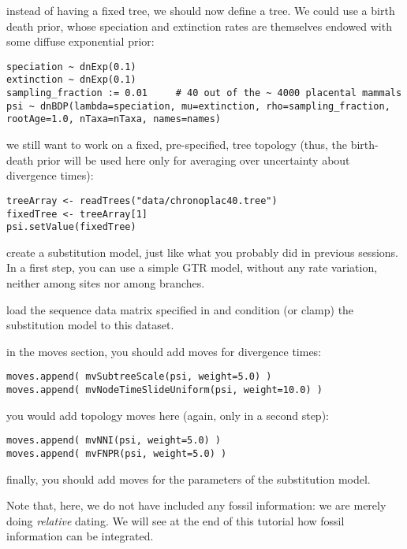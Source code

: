 instead of having a fixed tree, we should now define a  tree. We could use a birth death prior, whose speciation and extinction rates are themselves endowed with some diffuse exponential prior:
{\tt \small \begin{snugshade*}
\begin{lstlisting}
speciation ~ dnExp(0.1)
extinction ~ dnExp(0.1)
sampling_fraction := 0.01     # 40 out of the ~ 4000 placental mammals
psi ~ dnBDP(lambda=speciation, mu=extinction, rho=sampling_fraction, rootAge=1.0, nTaxa=nTaxa, names=names)
\end{lstlisting}
\end{snugshade*}}
we still want to work on a fixed, pre-specified, tree topology (thus, the birth-death prior will be used here only for averaging over uncertainty about divergence times):
{\tt \small \begin{snugshade*}
\begin{lstlisting}
treeArray <- readTrees("data/chronoplac40.tree")
fixedTree <- treeArray[1]
psi.setValue(fixedTree)
\end{lstlisting}
\end{snugshade*}}
create a substitution model, just like what you probably did in previous sessions. In a first step, you can use a simple GTR model, without any rate variation, neither among sites nor among branches.

load the sequence data matrix specified in  and condition (or clamp) the substitution model to this dataset.

in the moves section, you should add moves for divergence times:
{\tt \small \begin{snugshade*}
\begin{lstlisting}
moves.append( mvSubtreeScale(psi, weight=5.0) )
moves.append( mvNodeTimeSlideUniform(psi, weight=10.0) )
\end{lstlisting}
\end{snugshade*}}
you would add topology moves here (again, only in a second step):
{\tt \small \begin{snugshade*}
\begin{lstlisting}
moves.append( mvNNI(psi, weight=5.0) )
moves.append( mvFNPR(psi, weight=5.0) )
\end{lstlisting}
\end{snugshade*}}
finally, you should add moves for the parameters of the substitution model.

Note that, here, we do not have included any fossil information: we are merely doing \emph{relative} dating. We will see at the end of this tutorial how fossil information can be integrated.

